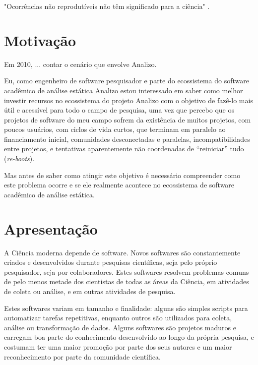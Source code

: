 
"Ocorrências não reprodutíveis não têm significado para a ciência" \cite{popper2004logica}.

\section{Motivação}

Em 2010, ... contar o cenário que envolve Analizo.

Eu, como engenheiro de software pesquisador e parte do ecossistema do software
acadêmico de análise estática Analizo estou interessado em saber como melhor
investir recursos no ecossistema do projeto Analizo com o objetivo de fazê-lo
mais útil e acessível para todo o campo de pesquisa, uma vez que percebo que os
projetos de software do meu campo sofrem da existência de muitos projetos, com
poucos usuários, com ciclos de vida curtos, que terminam em paralelo ao
financiamento inicial, comunidades desconectadas e paralelas,
incompatibilidades entre projetos, e tentativas aparentemente não coordenadas
de ``reiniciar'' tudo ({\it re-boots}).

Mas antes de saber como atingir este objetivo é necessário compreender como
este problema ocorre e se ele realmente acontece no ecossistema de software
acadêmico de análise estática.



\section{Apresentação}

A Ciência moderna depende de software. Novos softwares são constantemente
criados e desenvolvidos durante pesquisas científicas, seja pelo próprio pesquisador,
seja por colaboradores. 
Estes softwares resolvem problemas comuns de pelo menos metade dos cientistas 
de todas as áreas da Ciência, em atividades de coleta ou análise, 
e em outras atividades de pesquisa.

Estes softwares variam em tamanho e finalidade: alguns são simples
scripts para automatizar tarefas repetitivas, enquanto outros são utilizados para
coleta, análise ou transformação de dados. Alguns softwares são projetos maduros e
carregam boa parte do conhecimento desenvolvido ao longo da própria pesquisa, e
costumam ter uma maior promoção por parte dos seus autores e um maior
reconhecimento por parte da comunidade científica.

